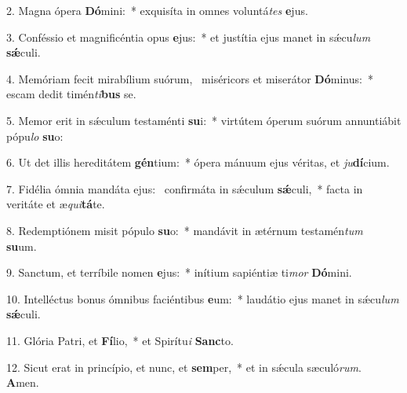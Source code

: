 2. Magna ópera \textbf{Dó}mini:~*  exquisíta in omnes voluntá\textit{tes} \textbf{e}jus.\

3. Conféssio et magnificéntia opus \textbf{e}jus:~*  et justítia ejus manet in sǽcu\textit{lum} \textbf{sǽ}culi.\

4. Memóriam fecit mirabílium suórum, \dag\  miséricors et miserátor \textbf{Dó}minus:~*  escam dedit timén\textit{ti}\textbf{bus} se.\

5. Memor erit in sǽculum testaménti \textbf{su}i:~*  virtútem óperum suórum annuntiábit pópu\textit{lo} \textbf{su}o:\

6. Ut det illis hereditátem \textbf{gén}tium:~*  ópera mánuum ejus véritas, et \textit{ju}\textbf{dí}cium.\

7. Fidélia ómnia mandáta ejus: \dag\  confirmáta in sǽculum \textbf{sǽ}culi,~*  facta in veritáte et æ\textit{qui}\textbf{tá}te.\

8. Redemptiónem misit pópulo \textbf{su}o:~*  mandávit in ætérnum testamén\textit{tum} \textbf{su}um.\

9. Sanctum, et terríbile nomen \textbf{e}jus:~*  inítium sapiéntiæ ti\textit{mor} \textbf{Dó}mini.\

10. Intelléctus bonus ómnibus faciéntibus \textbf{e}um:~*  laudátio ejus manet in sǽcu\textit{lum} \textbf{sǽ}culi.\

11. Glória Patri, et \textbf{Fí}lio,~*  et Spirítu\textit{i} \textbf{Sanc}to.\

12. Sicut erat in princípio, et nunc, et \textbf{sem}per,~*  et in sǽcula sæculó\textit{rum}. \textbf{A}men.\


